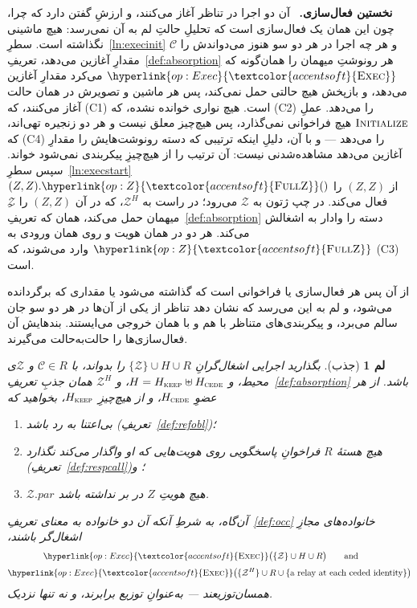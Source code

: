 \documentclass[10pt,oneside,openany]{book}
\newcommand{\pars}{\mathit{par}}
\newcommand{\Corr}{\mathcal{C}}
\newcommand{\Zenv}{\mathcal{Z}}
\newcommand{\op}[1]{\textnormal{\textsc{#1}}}
\newcommand{\opl}[1]{\hyperlink{op:#1}{\textcolor{accentsoft}{\op{#1}}}}
\newcommand{\fopl}[1]{\hyperlink{op:#1}{\textcolor{accentsoft}{\op{Full}\op{#1}}}}
\newcommand{\heading}[1]{\medskip\par\noindent\textcolor{accent}{\textbf{#1.}}\ }
\theoremstyle{accentdef}
\theoremstyle{accentplain}
\newtheorem{lemma}[definition]{لم}
\begin{document}
\heading{نخستین فعال‌سازی} آن دو اجرا در تناظر آغاز می‌کنند، و ارزشِ گفتن
دارد که چرا، چون این همان یک فعال‌سازی است که تحلیلِ حالتِ لم به آن
نمی‌رسد: هیچ ماشینی نگذاشته است.
سطرِ~\ref{ln:execinit} $\Corr$ و هر چه اجرا در هر دو سو هنوز می‌دواندش را
مقدارِ آغازین می‌دهد، تعریفِ~\ref{def:absorption} هر رونوشتِ میهمان را
همان‌گونه که $\opl{Exec}$ می‌کرد مقدارِ آغازین می‌دهد، و بازپخش هیچ حالتی
حمل نمی‌کند، پس هر ماشین و تصویرش در همان حالت آغاز می‌کنند، که (C1) است.
هیچ نواری خوانده نشده، که (C2) را می‌دهد. عملِ $\op{Initialize}$ هیچ
فراخوانی نمی‌گذارد، پس هیچ‌چیز معلق نیست و هر دو زنجیره تهی‌اند، که (C4)
را می‌دهد --- و با آن، دلیلِ اینکه ترتیبی که دسته رونوشت‌هایش را مقدارِ
آغازین می‌دهد مشاهده‌شدنی نیست: آن ترتیب را از هیچ‌چیزِ پیکربندی نمی‌شود
خواند. سپس سطرِ~\ref{ln:execstart} $(Z,Z).\fopl{Z}()$ از $(Z,Z)$ را فعال
می‌کند. در چپ ژتون به $\Zenv$ می‌رود؛ در راست به $\Zenv^{H}$، که در آن
$(Z,Z)$ را $\Zenv$ِ میهمان حمل می‌کند، همان که
تعریفِ~\ref{def:absorption} دسته را وادار به اشغالش می‌کند. هر دو در همان
هویت و روی همان ورودی به $\fopl{Z}$ وارد می‌شوند، که (C3) است.

از آن پس هر فعال‌سازی یا فراخوانی است که گذاشته می‌شود یا مقداری که
برگردانده می‌شود، و لم به این می‌رسد که نشان دهد تناظر از یکی از آن‌ها در
هر دو سو جان سالم می‌برد، و پیکربندی‌های متناظر با هم و با همان خروجی
می‌ایستند. بندهایش آن فعال‌سازی‌ها را حالت‌به‌حالت می‌گیرند.

\begin{lemma}[جذب]\label{lem:absorb}
بگذارید اجرایی اشغال‌گرانِ $\{\Zenv\} \cup H \cup R$ را بدواند، با $\Corr
\in R$ و $\Zenv$ی محیط، و $H = H_{\op{keep}} \uplus H_{\op{cede}}$، و
$\Zenv^{H}$ همان جذبِ تعریفِ~\ref{def:absorption} باشد. از هر عضوِ
$H_{\op{cede}}$، و از هیچ‌چیزِ $H_{\op{keep}}$، بخواهید که
\begin{enumerate}[label=(\alph*),leftmargin=2.2em]
  \item بی‌اعتنا به رد باشد (تعریفِ~\ref{def:refobl})؛
  \item هیچ هستهٔ $R$ فراخوانِ پاسخگویی روی هویت‌هایی که او واگذار می‌کند
        نگذارد (تعریفِ~\ref{def:respcall})؛ و
  \item $\Zenv.\pars$ هیچ هویتِ $Z$ در بر نداشته باشد.
\end{enumerate}
آن‌گاه، به شرطِ آنکه آن دو خانواده به معنای تعریفِ~\ref{def:occ}
خانواده‌های مجازِ اشغال‌گر باشند،
\[
  \begin{gathered}
  \opl{Exec}\bigl(\{\Zenv\} \cup H \cup R\bigr)
  \qquad\text{and}\qquad \\[3pt]
  \opl{Exec}\bigl(\{\Zenv^{H}\} \cup R \cup \{\text{a relay at each ceded identity}\}\bigr)
  \end{gathered}
\]
همسان‌توزیعند --- به‌عنوانِ توزیع برابرند، و نه تنها نزدیک.
\end{lemma}
\end{document}
